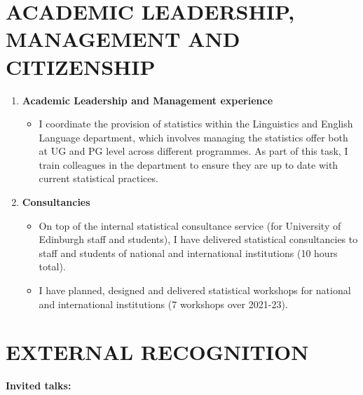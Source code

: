 \documentclass{article}
\begin{document}
\section{ACADEMIC LEADERSHIP, MANAGEMENT AND CITIZENSHIP}

\begin{enumerate}
\item \textbf{Academic Leadership and Management experience}
	\begin{itemize}
	\item I coordinate the provision of statistics within the Linguistics and English Language department, which involves managing the statistics offer both at UG and PG level across different programmes. As part of this task, I train colleagues in the department to ensure they are up to date with current statistical practices.
	\end{itemize}
\item \textbf{Consultancies}
	\begin{itemize}
	\item On top of the internal statistical consultance service (for University of Edinburgh staff and students), I have delivered statistical consultancies to staff and students of national and international institutions (10 hours total).
  \item I have planned, designed and delivered statistical workshops for national and international institutions (7 workshops over 2021-23).
	\end{itemize}
\end{enumerate}

\section{EXTERNAL RECOGNITION}

\textbf{Invited talks:}
\end{document}
